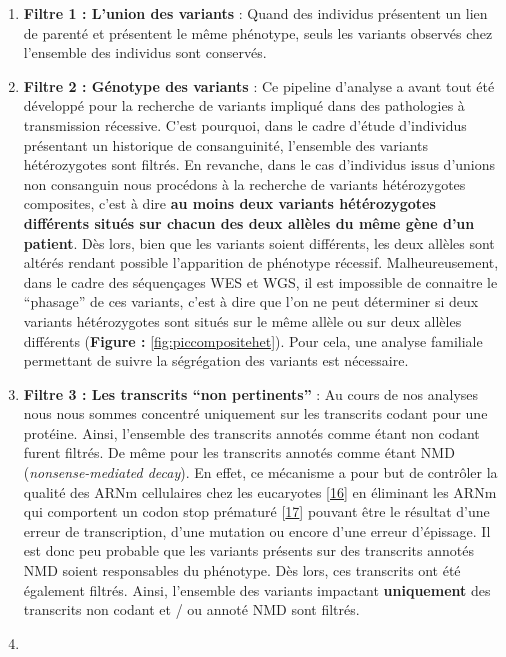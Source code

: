 \documentclass[12pt,twoside]{ugathesis}
\begin{document}
\begin{enumerate}
\def\labelenumi{\arabic{enumi}.}
\item
  \textbf{Filtre 1 : L'union des variants} : Quand des individus
  présentent un lien de parenté et présentent le même phénotype, seuls
  les variants observés chez l'ensemble des individus sont conservés.
\item
  \textbf{Filtre 2 : Génotype des variants} : Ce pipeline d'analyse a
  avant tout été développé pour la recherche de variants impliqué dans
  des pathologies à transmission récessive. C'est pourquoi, dans le
  cadre d'étude d'individus présentant un historique de consanguinité,
  l'ensemble des variants hétérozygotes sont filtrés. En revanche, dans
  le cas d'individus issus d'unions non consanguin nous procédons à la
  recherche de variants hétérozygotes composites, c'est à dire
  \textbf{au moins deux variants hétérozygotes différents situés sur
  chacun des deux allèles du même gène d'un patient}. Dès lors, bien que
  les variants soient différents, les deux allèles sont altérés rendant
  possible l'apparition de phénotype récessif. Malheureusement, dans le
  cadre des séquençages WES et WGS, il est impossible de connaitre le
  ``phasage'' de ces variants, c'est à dire que l'on ne peut déterminer
  si deux variants hétérozygotes sont situés sur le même allèle ou sur
  deux allèles différents (\textbf{Figure : }\ref{fig:piccompositehet}).
  Pour cela, une analyse familiale permettant de suivre la ségrégation
  des variants est nécessaire.
\item
  \textbf{Filtre 3 : Les transcrits ``non pertinents''} : Au cours de
  nos analyses nous nous sommes concentré uniquement sur les transcrits
  codant pour une protéine. Ainsi, l'ensemble des transcrits annotés
  comme étant non codant furent filtrés. De même pour les transcrits
  annotés comme étant NMD (\emph{nonsense-mediated decay}). En effet, ce
  mécanisme a pour but de contrôler la qualité des ARNm cellulaires chez
  les eucaryotes {[}\protect\hyperlink{ref-Chang2007}{16}{]} en
  éliminant les ARNm qui comportent un codon stop prématuré
  {[}\protect\hyperlink{ref-Baker2004}{17}{]} pouvant être le résultat
  d'une erreur de transcription, d'une mutation ou encore d'une erreur
  d'épissage. Il est donc peu probable que les variants présents sur des
  transcrits annotés NMD soient responsables du phénotype. Dès lors, ces
  transcrits ont été également filtrés. Ainsi, l'ensemble des variants
  impactant \textbf{uniquement} des transcrits non codant et / ou annoté
  NMD sont filtrés.
\item

\end{enumerate}
\end{document}
